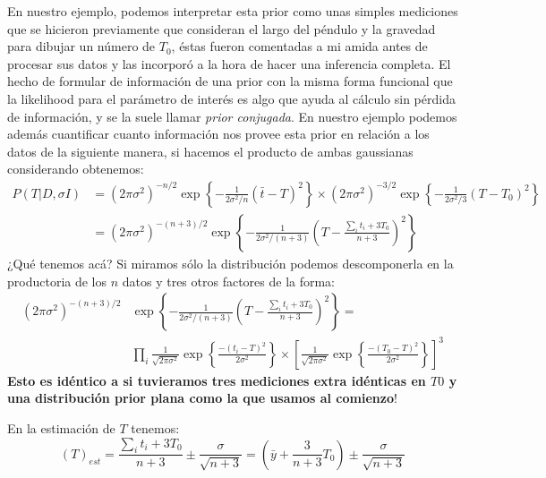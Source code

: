 \documentclass[aps,onecolumn,12pt,notitlepage]{revtex4-1}
\begin{document}
En nuestro ejemplo, podemos interpretar esta prior como unas simples mediciones que se hicieron previamente que consideran el largo del péndulo y la gravedad para dibujar un número de $T_{0}$, éstas fueron comentadas a mi amida antes de procesar sus datos y las incorporó a la hora de hacer una inferencia completa. 
El hecho de formular de información de una prior con la misma forma funcional que la likelihood para el parámetro de interés es algo que ayuda al cálculo sin pérdida de información, y se la suele llamar \textit{prior conjugada}. En nuestro ejemplo podemos además cuantificar cuanto información nos provee esta prior en relación a los datos de la siguiente manera, si hacemos el producto de ambas gaussianas considerando obtenemos:
\begin{equation}
\begin{aligned}
P(T|D,\sigma I) &=\left(2\pi\sigma^2\right)^{-n/2}\exp\left\{-\frac{1}{2\sigma^{2}/n}(\bar{t}-T)^2\right\} \times \left(2\pi\sigma^2\right)^{-3/2}\exp\left\{-\frac{1}{2\sigma^{2}/3}(T-T_{0})^2\right\} \\ &= \left(2\pi\sigma^2\right)^{-(n+3)/2}\exp\left\{-\frac{1}{2\sigma^{2}/(n+3)}\left(T-\frac{\sum_{i}t_{i}+3T_{0}}{n+3}\right)^2\right\}
\end{aligned}
\end{equation}
¿Qué tenemos acá? Si miramos sólo la distribución podemos descomponerla en la productoria de los $n$ datos y tres otros factores de la forma:
\begin{equation}
\begin{aligned}
\left(2\pi\sigma^2\right)^{-(n+3)/2}&\exp\left\{-\frac{1}{2\sigma^{2}/(n+3)}\left(T-\frac{\sum_{i}t_{i}+3T_{0}}{n+3}\right)^2\right\} = \\ & \prod_{i} \frac{1}{\sqrt{2\pi \sigma^2}} \exp\left\{\frac{-(t_{i}-T)^2}{2\sigma^2}\right\} \times \left[\frac{1}{\sqrt{2\pi \sigma^2}} \exp\left\{\frac{-(T_{0}-T)^2}{2\sigma^2}\right\}\right]^3
\end{aligned}
\end{equation}
\textbf{Esto es idéntico a si tuvieramos tres mediciones extra idénticas en $T0$ y una distribución prior plana como la que usamos al comienzo}!

En la estimación de $T$ tenemos:
\begin{equation}
(T)_{est} = \frac{\sum_{i}t_{i}+3T_{0}}{n+3} \pm \frac{\sigma}{\sqrt{n+3}} = \left(\bar{y} + \frac{3}{n+3}T_{0}\right)  \pm \frac{\sigma}{\sqrt{n+3}}
\end{equation}
\end{document}
